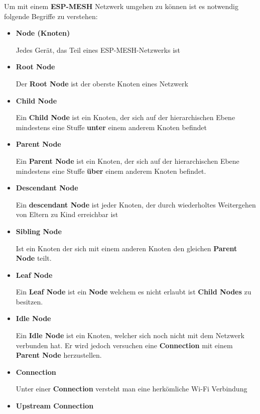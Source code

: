 Um mit einem \textbf{ESP-MESH} Netzwerk umgehen zu können ist es notwendig folgende Begriffe zu verstehen:
\begin{itemize}
    \item \textbf{Node (Knoten)}
    
    Jedes Gerät, das Teil eines ESP-MESH-Netzwerks ist
    \item \textbf{Root Node}
    
    Der \textbf{Root Node} ist der oberste Knoten eines Netzwerk

    \item \textbf{Child Node}
    
    Ein \textbf{Child Node} ist ein Knoten, der sich auf der hierarchischen Ebene mindestens eine Stuffe \textbf{unter} einem anderem Knoten befindet

    \item \textbf{Parent Node}
    
    Ein \textbf{Parent Node} ist ein Knoten, der sich auf der hierarchischen Ebene mindestens eine Stuffe \textbf{über} einem anderem Knoten befindet.

    \item \textbf{Descendant Node}
    
    Ein \textbf{descendant Node} ist jeder Knoten, der durch wiederholtes Weitergehen von Eltern zu Kind erreichbar ist

    \item \textbf{Sibling Node}
    
    Ist ein Knoten der sich mit einem anderen Knoten den gleichen \textbf{Parent Node} teilt.

    \item \textbf{Leaf Node}
    
    Ein \textbf{Leaf Node} ist ein \textbf{Node} welchem es nicht erlaubt ist \textbf{Child Nodes} zu besitzen.

    \item \textbf{Idle Node}
    
    Ein \textbf{Idle Node} ist ein Knoten, welcher sich noch nicht mit dem Netzwerk verbunden hat. Er wird jedoch versuchen eine \textbf{Connection} mit einem \textbf{Parent Node} herzustellen.

    \item \textbf{Connection}
    
    Unter einer \textbf{Connection} versteht man eine herkömliche Wi-Fi Verbindung

    \item \textbf{Upstream Connection}
    

\end{itemize}
